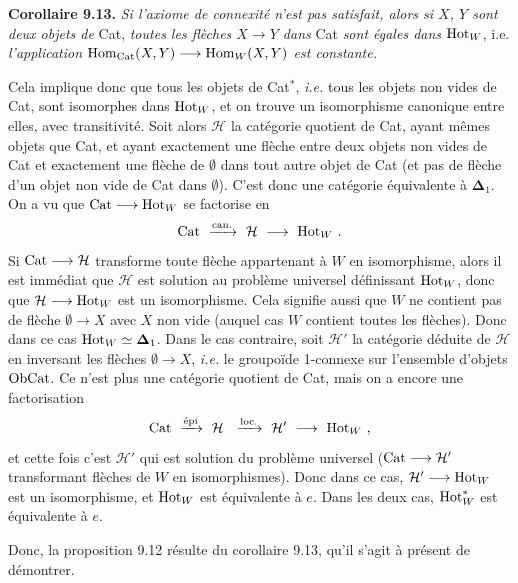 \textbf{Corollaire 9.13.} \textit{Si l'axiome de connexité n'est pas satisfait, alors si $X$, $Y$ sont deux objets de} Cat, \textit{toutes les flèches $X\longrightarrow Y$ dans} Cat \textit{sont égales dans} $\mathrm{Hot}_W$, i.e. \textit{l'application} $\mathrm{Hom}_{\mathrm{Cat}}(X,Y)\longrightarrow\mathrm{Hom}_W(X,Y)$ \textit{est constante.}

Cela implique donc que tous les objets de Cat$^*$, \textit{i.e.} tous les objets non vides de Cat, sont isomorphes dans $\mathrm{Hot}_W$, et on trouve un isomorphisme canonique entre elles, avec transitivité. Soit alors $\mathcal{H}$ la catégorie quotient de Cat, ayant mêmes objets que Cat, et ayant exactement une flèche entre deux objets non vides de Cat et exactement une flèche de $\emptyset$ dans tout autre objet de Cat (et pas de flèche d'un objet non vide de Cat dans $\emptyset$). C'est donc une catégorie équivalente à $\boldsymbol{\Delta}_1$. On a vu que $\mathrm{Cat}\longrightarrow\mathrm{Hot}_W$ se factorise en
\[
\Cat\ \xrightarrow{\text{can.}}\ \mathcal{H}\ \longrightarrow\ \Hot_W\ .
\]
Si $\mathrm{Cat}\longrightarrow\mathcal{H}$ transforme toute flèche appartenant à $W$ en isomorphisme, alors il est immédiat que $\mathcal{H}$ est solution au problème universel définissant $\mathrm{Hot}_W$, donc que $\mathcal{H}\longrightarrow\mathrm{Hot}_W$ est un isomorphisme. Cela signifie aussi que $W$ ne contient pas de flèche $\emptyset\longrightarrow X$ avec $X$ non vide (auquel cas $W$ contient toutes les flèches). Donc dans ce cas $\mathrm{Hot}_W\simeq\boldsymbol{\Delta}_1$. Dans le cas contraire, soit $\mathcal{H}'$ la catégorie déduite de $\mathcal{H}$ en inversant les flèches $\emptyset\longrightarrow X$, \textit{i.e.} le groupoïde 1-connexe sur l'ensemble d'objets $\mathrm{Ob}\mathrm{Cat}$. Ce n'est plus une catégorie quotient de Cat, mais on a encore une factorisation
\[
\Cat\ \xrightarrow{\text{épi}}\ \mathcal{H}\ \ \xrightarrow{\text{loc.}}\ \mathcal{H}'\ \longrightarrow\ \Hot_W\ ,
\]
et cette fois c'est $\mathcal{H}'$ qui est solution du problème universel ($\mathrm{Cat}\longrightarrow\mathcal{H}'$ transformant flèches de $W$ en isomorphismes). Donc dans ce cas, $\mathcal{H}'\longrightarrow\mathrm{Hot}_W$ est un isomorphisme, et $\mathrm{Hot}_W$ est équivalente à $e$. Dans les deux cas, $\mathrm{Hot}_W^*$ est équivalente à $e$.

Donc, la proposition 9.12 résulte du corollaire 9.13, qu'il s'agit à présent de démontrer.

